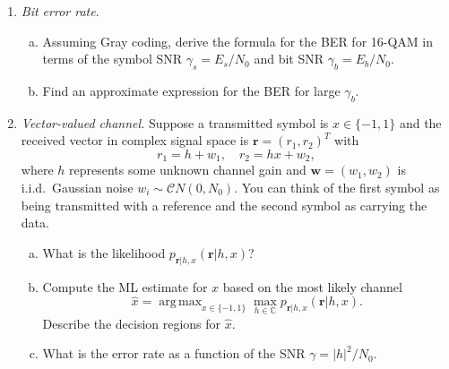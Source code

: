 \documentclass[11pt]{article}
\def\C{{\mathbb{C}}}
\def\argmax{\mathop{\mathrm{arg\,max}}}
\def\xhat{\widehat{x}}
\newcommand{\rbf}{\mathbf{r}}
\newcommand{\wbf}{\mathbf{w}}
\begin{document}
\begin{enumerate}
\begin{enumerate}[(a)]
\end{enumerate}

\item \emph{Bit error rate}.  
\begin{enumerate}[(a)]
\item Assuming Gray coding, derive the formula
for the BER for 16-QAM in terms of the symbol SNR $\gamma_s = E_s/N_0$ and 
bit SNR $\gamma_b = E_b/N_0$.

\item Find an approximate expression for the BER for large $\gamma_b$.
\end{enumerate}

\item \emph{Vector-valued channel.}
Suppose a transmitted symbol is $x \in \{-1,1\}$ and
the received vector in complex signal space is $\rbf=(r_1,r_2)^T$
with
\[
    r_1 = h + w_1, \quad r_2 = hx + w_2,
\]
where $h$ represents some unknown channel gain
and $\wbf = (w_1,w_2)$ is i.i.d.\
Gaussian noise $w_i \sim {\mathcal CN}(0,N_0)$.
You can think of the first symbol as being transmitted with a reference
and the second symbol as carrying the data.
\begin{enumerate}[(a)]
\item  What is the likelihood $p_{\rbf|h,x}(\rbf|h,x)$?
\item  Compute the ML estimate for $x$ based on
the most likely channel 
\[
    \xhat = \argmax_{x \in \{-1,1\} }
    \max_{h \in \C} p_{\rbf|h,x}(\rbf|h,x).
\]
Describe the decision regions for $\xhat$.
\item What is the 
error rate as a function of the SNR $\gamma = |h|^2/N_0$.
\end{enumerate}

\end{enumerate}
\end{document}
